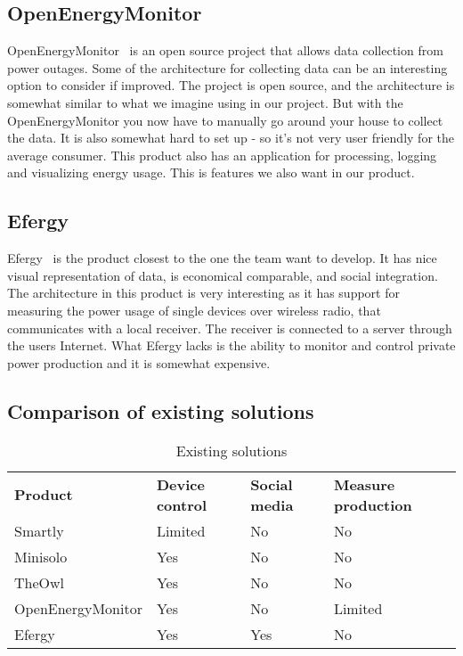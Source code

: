 \subsection{OpenEnergyMonitor}

OpenEnergyMonitor~\cite{openenergymonitor} is an open source project that allows data collection from power outages. Some of the architecture for collecting data can be an interesting option to consider if improved. The project is open source, and the architecture is somewhat similar to what we imagine using in our project. But with the OpenEnergyMonitor you now have to manually go around your house to collect the data. It is also somewhat hard to set up - so it’s not very user friendly for the average consumer.  This product also has an application for processing, logging and visualizing energy usage. This is features we also want in our product. 



\subsection{Efergy}

Efergy~\cite{efergy} is the product closest to the one the team want to develop. It has nice visual representation of data, is economical comparable, and social integration. The architecture in this product is very interesting as it has support for measuring the power usage of single devices over wireless radio, that communicates with a local receiver. The receiver is connected to a server through the users Internet. What Efergy lacks is the ability to monitor and control private power production and it is somewhat expensive.


\subsection{Comparison of existing solutions}

\begin{table}[H]
\centering
{}
\begin{tabular}{|l|l|l|l|}
\hline
\textbf{Product} & \textbf{Device control} & \textbf{Social media} & \textbf{Measure production}\\
Smartly & Limited & No  & No \\
Minisolo & Yes & No  & No \\
TheOwl & Yes & No & No \\
OpenEnergyMonitor & Yes & No  & Limited \\
Efergy & Yes & Yes &  No \\\hline
\end{tabular}
\caption{Existing solutions}
\label{tab:existingSolutions}
\end{table}
